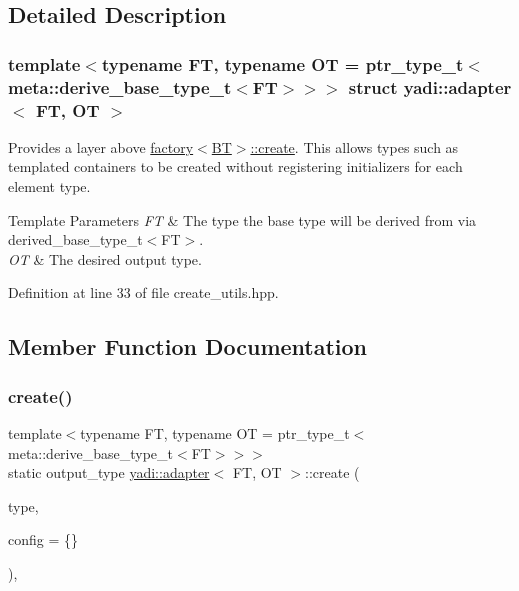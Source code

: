 \subsection{Detailed Description}
\subsubsection*{template$<$typename FT, typename OT = ptr\+\_\+type\+\_\+t$<$meta\+::derive\+\_\+base\+\_\+type\+\_\+t$<$\+F\+T$>$$>$$>$\newline
struct yadi\+::adapter$<$ F\+T, O\+T $>$}

Provides a layer above \hyperlink{structyadi_1_1factory_a600474900d2c6fa5d09935a641298bd5}{factory$<$\+B\+T$>$\+::create}. This allows types such as templated containers to be created without registering initializers for each element type. 


\begin{DoxyTemplParams}{Template Parameters}
{\em FT} & The type the base type will be derived from via derived\+\_\+base\+\_\+type\+\_\+t$<$\+F\+T$>$. \\
\hline
{\em OT} & The desired output type. \\
\hline
\end{DoxyTemplParams}


Definition at line 33 of file create\+\_\+utils.\+hpp.



\subsection{Member Function Documentation}
\mbox{\label{structyadi_1_1adapter_aaa3da42043e4278ad2d499f60e446602}} 
\subsubsection{\texorpdfstring{create()}{create()}}
{\footnotesize\ttfamily template$<$typename FT, typename OT = ptr\+\_\+type\+\_\+t$<$meta\+::derive\+\_\+base\+\_\+type\+\_\+t$<$\+F\+T$>$$>$$>$ \\
static output\+\_\+type \hyperlink{structyadi_1_1adapter}{yadi\+::adapter}$<$ FT, OT $>$\+::create (\begin{DoxyParamCaption}\item[{std\+::string const \&}]{type,  }\item[{Y\+A\+M\+L\+::\+Node const \&}]{config = {\ttfamily \{\}} }\end{DoxyParamCaption})\hspace{0.3cm}{\ttfamily [inline]}, {\ttfamily [static]}}



